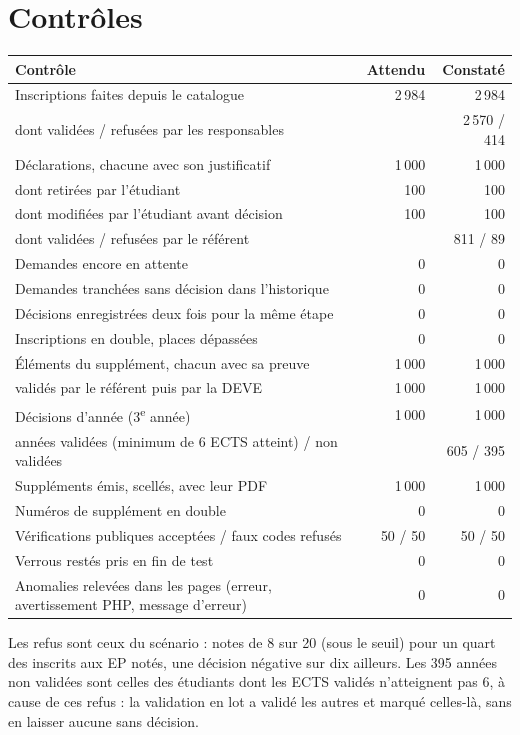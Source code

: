 \documentclass[11pt,a4paper]{article}
\begin{document}
\section{Contrôles}

\begin{center}
\begin{tabularx}{\linewidth}{@{}X r r@{}}
\toprule
\textbf{Contrôle} & \textbf{Attendu} & \textbf{Constaté} \\
\midrule
Inscriptions faites depuis le catalogue & 2\,984 & 2\,984 \\
\quad dont validées / refusées par les responsables & & 2\,570 / 414 \\
Déclarations, chacune avec son justificatif & 1\,000 & 1\,000 \\
\quad dont retirées par l'étudiant & 100 & 100 \\
\quad dont modifiées par l'étudiant avant décision & 100 & 100 \\
\quad dont validées / refusées par le référent & & 811 / 89 \\
Demandes encore en attente & 0 & 0 \\
Demandes tranchées sans décision dans l'historique & 0 & 0 \\
Décisions enregistrées deux fois pour la même étape & 0 & 0 \\
Inscriptions en double, places dépassées & 0 & 0 \\
Éléments du supplément, chacun avec sa preuve & 1\,000 & 1\,000 \\
\quad validés par le référent puis par la DEVE & 1\,000 & 1\,000 \\
Décisions d'année (3\textsuperscript{e} année) & 1\,000 & 1\,000 \\
\quad années validées (minimum de 6 ECTS atteint) / non validées & & 605 / 395 \\
Suppléments émis, scellés, avec leur PDF & 1\,000 & 1\,000 \\
Numéros de supplément en double & 0 & 0 \\
Vérifications publiques acceptées / faux codes refusés & 50 / 50 & 50 / 50 \\
Verrous restés pris en fin de test & 0 & 0 \\
Anomalies relevées dans les pages (erreur, avertissement PHP, message d'erreur) & 0 & 0 \\
\bottomrule
\end{tabularx}
\end{center}

Les refus sont ceux du scénario : notes de 8 sur 20 (sous le seuil) pour un quart des inscrits
aux EP notés, une décision négative sur dix ailleurs. Les 395 années non validées sont celles des
étudiants dont les ECTS validés n'atteignent pas 6, à cause de ces refus : la validation en lot a
validé les autres et marqué celles-là, sans en laisser aucune sans décision.
\end{document}
